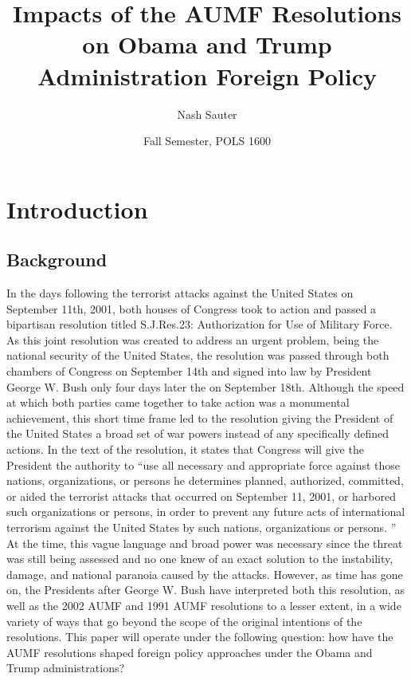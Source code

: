 \documentclass[12pt]{article}
\title{Impacts of the AUMF Resolutions on Obama and Trump Administration Foreign Policy}
\author{Nash Sauter}
\date{Fall Semester, POLS 1600}
\begin{document}
\maketitle
{}
\newpage
{}

\section*{Introduction}
\subsection*{Background}
In the days following the terrorist attacks against the United States on September 11th, 2001, both houses of Congress took to action and passed a bipartisan resolution titled S.J.Res.23: Authorization for Use of Military Force.
As this joint resolution was created to address an urgent problem, being the national security of the United States, the resolution was passed through both chambers of Congress on September 14th and signed into law by President George W. Bush only four days later the on September 18th.
Although the speed at which both parties came together to take action was a monumental achievement, this short time frame led to the resolution giving the President of the United States a broad set of war powers instead of any specifically defined actions.
In the text of the resolution, it states that Congress will give the President the authority to ``use all necessary and appropriate force against those nations, organizations, or persons he determines planned, authorized, committed, or aided the terrorist attacks that occurred on September 11, 2001, or harbored such organizations or persons, in order to prevent any future acts of international terrorism against the United States by such nations, organizations or persons. \autocite{daschle2001}''
At the time, this vague language and broad power was necessary since the threat was still being assessed and no one knew of an exact solution to the instability, damage, and national paranoia caused by the attacks.
However, as time has gone on, the Presidents after George W. Bush have interpreted both this resolution, as well as the 2002 AUMF and 1991 AUMF resolutions to a lesser extent, in a wide variety of ways that go beyond the scope of the original intentions of the resolutions.
This paper will operate under the following question: how have the AUMF resolutions shaped foreign policy approaches under the Obama and Trump administrations?
\end{document}
